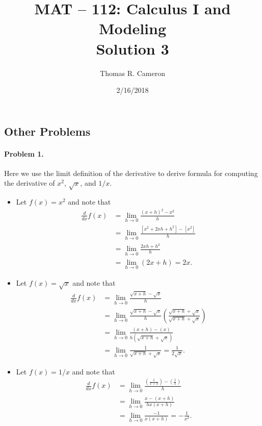 \documentclass{article}
\title{MAT -- 112: Calculus I and Modeling\\
\large{Solution 3}}
\author{Thomas R. Cameron}
\date{2/16/2018}
\begin{document}
\maketitle

\subsection*{Other Problems}

\paragraph*{Problem 1.}	Here we use the limit definition of the derivative to derive formula for computing the derivative of $x^{2}$, $\sqrt{x}$, and $1/x$. 
\begin{itemize}
\item	Let $f(x)=x^{2}$ and note that
\begin{align*}
\frac{d}{dx}f(x)&=\lim_{h\rightarrow 0}\frac{(x+h)^{2}-x^{2}}{h} \\
&=\lim_{h\rightarrow 0}\frac{[x^{2}+2xh+h^{2}]-[x^{2}]}{h} \\
&=\lim_{h\rightarrow 0}\frac{2xh+h^{2}}{h} \\
&=\lim_{h\rightarrow 0}(2x+h)=2x.
\end{align*}
\item	Let $f(x)=\sqrt{x}$ and note that
\begin{align*}
\frac{d}{dx}f(x)&=\lim_{h\rightarrow 0}\frac{\sqrt{x+h}-\sqrt{x}}{h} \\
&=\lim_{h\rightarrow 0}\frac{\sqrt{x+h}-\sqrt{x}}{h}\left(\frac{\sqrt{x+h}+\sqrt{x}}{\sqrt{x+h}+\sqrt{x}}\right) \\
&=\lim_{h\rightarrow 0}\frac{(x+h)-(x)}{h\left(\sqrt{x+h}+\sqrt{x}\right)} \\
&=\lim_{h\rightarrow 0}\frac{1}{\sqrt{x+h}+\sqrt{x}}=\frac{1}{2\sqrt{x}}.
\end{align*}
\item	Let $f(x)=1/x$ and note that
\begin{align*}
\frac{d}{dx}f(x)&=\lim_{h\rightarrow 0}\frac{\left(\frac{1}{x+h}\right)-\left(\frac{1}{x}\right)}{h} \\
&=\lim_{h\rightarrow 0}\frac{x-(x+h)}{hx(x+h)} \\
&=\lim_{h\rightarrow 0}\frac{-1}{x(x+h)}=-\frac{1}{x^{2}}. 
\end{align*}
\end{itemize}
\end{document}
